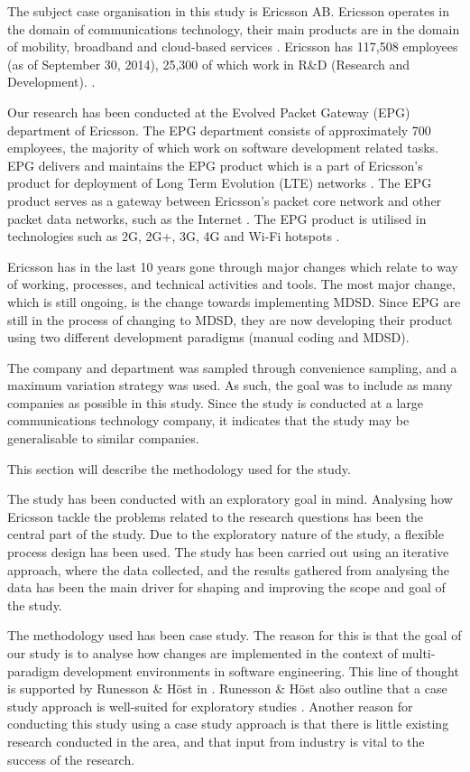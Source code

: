 \documentclass[10pt,twocolumn]{article}
\begin{document}
The subject case organisation in this study is Ericsson AB. Ericsson operates in the domain of communications technology, their main products are in the domain of mobility, broadband and cloud-based services \cite{a7} \cite{a8}. Ericsson has 117,508 employees (as of September 30, 2014), 25,300 of which work in R\&D (Research and Development). \cite{a7}. 

Our research has been conducted at the Evolved Packet Gateway (EPG) department of Ericsson. The EPG department consists of approximately 700 employees, the majority of which work on software development related tasks. EPG delivers and maintains the EPG product which is a part of Ericsson's product for deployment of Long Term Evolution (LTE) networks \cite{a9}. The EPG product serves as a gateway between Ericsson's packet core network and other packet data networks, such as the Internet \cite{a9}. The EPG product is utilised in technologies such as 2G, 2G+, 3G, 4G and Wi-Fi hotspots \cite{a9}. 

Ericsson has in the last 10 years gone through major changes which relate to way of working, processes, and technical activities and tools. The most major change, which is still ongoing, is the change towards implementing MDSD. Since EPG are still in the process of changing to MDSD, they are now developing their product using two different development paradigms (manual coding and MDSD). 

The company and department was sampled through convenience sampling, and a maximum variation strategy was used. As such, the goal was to include as many companies as possible in this study. Since the study is conducted at a large communications technology company, it indicates that the study may be generalisable to similar companies.

This section will describe the methodology used for the study. 

The study has been conducted with an exploratory goal in mind. Analysing how Ericsson tackle the problems related to the research questions has been the central part of the study. Due to the exploratory nature of the study, a flexible process design has been used. The study has been carried out using an iterative approach, where the data collected, and the results gathered from analysing the data has been the main driver for shaping and improving the scope and goal of the study. 

The methodology used has been case study. The reason for this is that the goal of our study is to analyse how changes are implemented in the context of multi-paradigm development environments in software engineering. This line of thought is supported by Runesson \& Höst in \cite{runeson2009guidelines}. Runesson \& Höst also outline that a case study approach is well-suited for exploratory studies \cite{runeson2009guidelines}. Another reason for conducting this study using a case study approach is that there is little existing research conducted in the area, and that input from industry is vital to the success of the research. 
\end{document}
